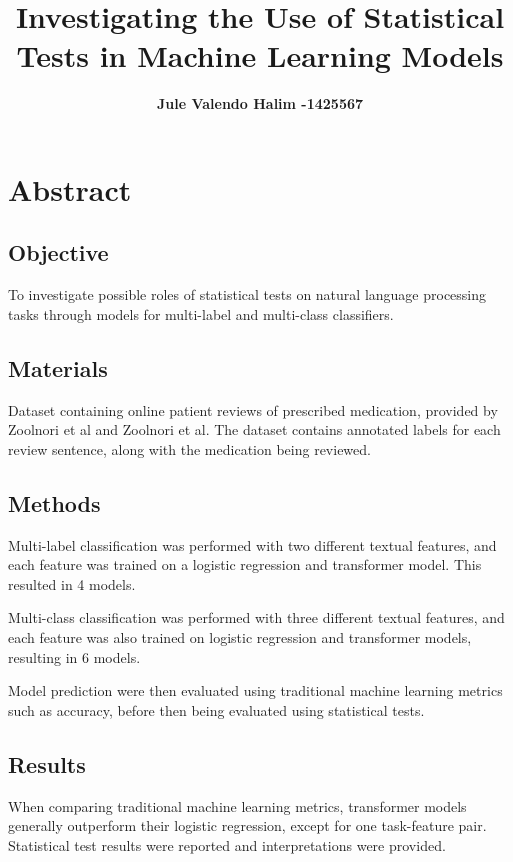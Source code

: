 \documentclass[10.7pt, onecolumn]{article}
\title{\vspace{-2em} Investigating the Use of Statistical Tests in Machine Learning Models}
\author[ ]{\bf\fontsize{13}{14}\selectfont Jule Valendo Halim -1425567\vspace{-.7em}}
\affil[ ]{\bf\fontsize{13}{14}\selectfont University of Melbourne}
\date{} %
\begin{document}
\maketitle
\vspace{-4em} %

\section{Abstract}\label{abstract}
\subsection{Objective}

To investigate possible roles of statistical tests on natural language processing tasks through models for multi-label and multi-class classifiers.
\subsection{Materials}

Dataset containing online patient reviews of prescribed medication, provided by Zoolnori et al\cite{psyTAR1} and Zoolnori et al\cite{psyTar2}. The dataset contains annotated labels for each review sentence, along with the medication being reviewed.
\subsection{Methods}

Multi-label classification was performed with two different textual features, and each feature was trained on a logistic regression and transformer model. This resulted in 4 models. 

Multi-class classification was performed with three different textual features, and each feature was also trained on logistic regression and transformer models, resulting in 6 models.

Model prediction were then evaluated using traditional machine learning metrics such as accuracy, before then being evaluated using statistical tests.

\subsection{Results}

When comparing traditional machine learning metrics, transformer models generally outperform their logistic regression, except for one task-feature pair. Statistical test results were reported and interpretations were provided.
\end{document}
